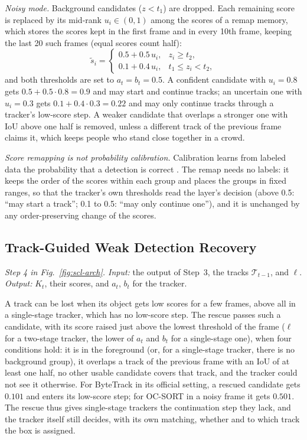 \emph{Noisy mode.} Background candidates ($z<t_1$) are dropped. Each remaining score is replaced by its mid-rank $u_i\in(0,1)$ among the scores of a remap memory, which stores the scores kept in the first frame and in every 10th frame, keeping the last 20 such frames (equal scores count half):
\begin{equation}
\tilde{s}_i=
\begin{cases}
0.5+0.5\,u_i, & z_i\ge t_2,\\
0.1+0.4\,u_i, & t_1\le z_i<t_2,
\end{cases}
\label{eq:scl-remap}
\end{equation}
and both thresholds are set to $a_t=b_t=0.5$. A confident candidate with $u_i=0.8$ gets $0.5+0.5\cdot0.8=0.9$ and may start and continue tracks; an uncertain one with $u_i=0.3$ gets $0.1+0.4\cdot0.3=0.22$ and may only continue tracks through a tracker's low-score step. A weaker candidate that overlaps a stronger one with IoU above one half is removed, unless a different track of the previous frame claims it, which keeps people who stand close together in a crowd.

\emph{Score remapping is not probability calibration.} Calibration learns from labeled data the probability that a detection is correct \cite{kuppers2020detcalib}. The remap needs no labels: it keeps the order of the scores within each group and places the groups in fixed ranges, so that the tracker's own thresholds read the layer's decision (above 0.5: ``may start a track''; 0.1 to 0.5: ``may only continue one''), and it is unchanged by any order-preserving change of the scores.

\subsection{Track-Guided Weak Detection Recovery}\label{sec:scl-rescue}
\emph{Step 4 in Fig.~\ref{fig:scl-arch}. Input:} the output of Step~3, the tracks $\mathcal{T}_{t-1}$, and $\ell$. \emph{Output:} $K_t$, their scores, and $a_t$, $b_t$ for the tracker.

A track can be lost when its object gets low scores for a few frames, above all in a single-stage tracker, which has no low-score step. The rescue passes such a candidate, with its score raised just above the lowest threshold of the frame ($\ell$ for a two-stage tracker, the lower of $a_t$ and $b_t$ for a single-stage one), when four conditions hold: it is in the foreground (or, for a single-stage tracker, there is no background group), it overlaps a track of the previous frame with an IoU of at least one half, no other usable candidate covers that track, and the tracker could not see it otherwise. For ByteTrack in its official setting, a rescued candidate gets $0.101$ and enters its low-score step; for OC-SORT in a noisy frame it gets $0.501$. The rescue thus gives single-stage trackers the continuation step they lack, and the tracker itself still decides, with its own matching, whether and to which track the box is assigned.

